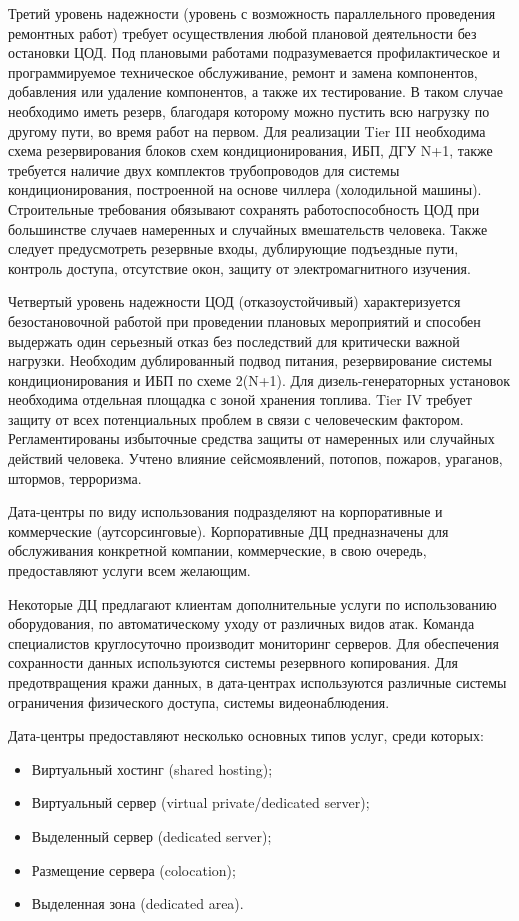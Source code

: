 Третий уровень надежности (уровень с возможность параллельного проведения ремонтных работ) требует осуществления любой плановой деятельности без остановки ЦОД.
Под плановыми работами подразумевается профилактическое и программируемое техническое обслуживание, ремонт и замена компонентов, добавления или удаление компонентов, а также их тестирование.
В таком случае необходимо иметь резерв, благодаря которому можно пустить всю нагрузку по другому пути, во время работ на первом.
Для реализации Tier III необходима схема резервирования блоков схем кондиционирования, ИБП, ДГУ N+1, также требуется наличие двух комплектов трубопроводов для системы кондиционирования, построенной на основе чиллера (холодильной машины).
Строительные требования обязывают сохранять работоспособность ЦОД при большинстве случаев намеренных и случайных вмешательств человека.
Также следует предусмотреть резервные входы, дублирующие подъездные пути, контроль доступа, отсутствие окон, защиту от электромагнитного изучения.

Четвертый уровень надежности ЦОД (отказоустойчивый) характеризуется безостановочной работой при проведении плановых мероприятий и способен выдержать один серьезный отказ без последствий для критически важной нагрузки.
Необходим дублированный подвод питания, резервирование системы кондиционирования и ИБП по схеме 2(N+1).
Для дизель-генераторных установок необходима отдельная площадка с зоной хранения топлива.
Tier IV требует защиту от всех потенциальных проблем в связи с человеческим фактором.
Регламентированы избыточные средства защиты от намеренных или случайных действий человека.
Учтено влияние сейсмоявлений, потопов, пожаров, ураганов, штормов, терроризма.

Дата-центры по виду использования подразделяют на корпоративные и коммерческие (аутсорсинговые).
Корпоративные ДЦ предназначены для обслуживания конкретной компании, коммерческие, в свою очередь, предоставляют услуги всем желающим.

Некоторые ДЦ предлагают клиентам дополнительные услуги по использованию оборудования, по автоматическому уходу от различных видов атак.
Команда специалистов круглосуточно производит мониторинг серверов.
Для обеспечения сохранности данных используются системы резервного копирования.
Для предотвращения кражи данных, в дата-центрах используются различные системы ограничения физического доступа, системы видеонаблюдения.

Дата-центры предоставляют несколько основных типов услуг, среди которых:
\begin{itemize}
  \item Виртуальный хостинг (shared hosting);
  \item Виртуальный сервер (virtual private/dedicated server);
  \item Выделенный сервер (dedicated server);
  \item Размещение сервера (colocation);
  \item Выделенная зона (dedicated area).
\end{itemize}

